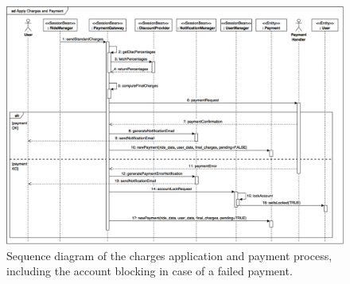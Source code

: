 \begin{figure}[H]
\begin{center}
		\includegraphics[width=\textwidth]{./arch_design/diagrams/apply_charges_pay_sd.png}
		\caption{Sequence diagram of the charges application and payment process, including the account blocking in case of a failed payment.}
		\label{apply_charges_pay_sd}
\end{center}
\end{figure}